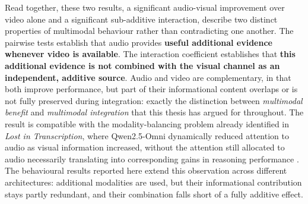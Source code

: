 Read together, these two results, a significant audio-visual improvement over video alone and a significant sub-additive interaction, describe two distinct properties of multimodal behaviour rather than contradicting one another. The pairwise tests establish that audio provides \textbf{useful additional evidence whenever video is available}. The interaction coefficient establishes that \textbf{this additional evidence is not combined with the visual channel as an independent, additive source}. Audio and video are complementary, in that both improve performance, but part of their informational content overlaps or is not fully preserved during integration: exactly the distinction between \textit{multimodal benefit} and \textit{multimodal integration} that this thesis has argued for throughout.
The result is compatible with the modality-balancing problem already identified in \textit{Lost in Transcription}, where Qwen2.5-Omni dynamically reduced attention to audio as visual information increased, without the attention still allocated to audio necessarily translating into corresponding gains in reasoning performance \cite{deodati2026lost}. The behavioural results reported here extend this observation across different architectures: additional modalities are used, but their informational contribution stays partly redundant, and their combination falls short of a fully additive effect.
